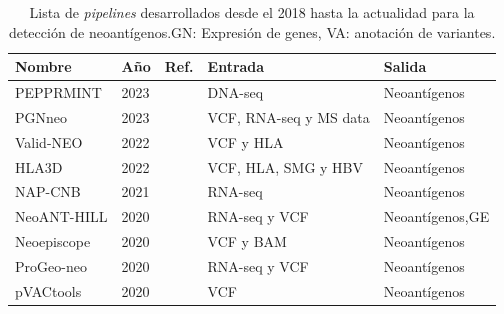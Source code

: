 \documentclass[a4paper,11pt]{article}
\begin{document}
	
\begin{table}[h]
	\caption{Lista de \textit{pipelines} desarrollados desde el 2018 hasta la actualidad para la detección de neoantígenos.GN: Expresión de genes, VA: anotación de variantes.}
	\label{tab:review_pipelines}
 \centering
	\setlength{\tabcolsep}{0.5em} %
	{\renewcommand{\arraystretch}{1.5}%
    {\footnotesize
    \begin{tabular}{lllp{4.5cm}p{2.7cm}}
	\textbf{Nombre} & \textbf{Año}  & \textbf{Ref.}                                 & \textbf{Entrada}                                         & \textbf{Salida}                                     \\ \hline
	
	PEPPRMINT         & 2023 &\cite{zhou2023prioritizing}         & DNA-seq                                                  & Neoantígenos                                        \\

	PGNneo & 2023	& \cite{tan2023pgnneo}	& VCF, RNA-seq y MS data	& Neoantígenos \\
	
	Valid-NEO       & 2022 &\cite{terai2022valid}             & VCF y HLA          & Neoantígenos  \\
	
	HLA3D & 2022	& \cite{li2022hla3d}	& VCF, HLA, SMG y HBV	& Neoantígenos \\
	
	
	
	NAP-CNB         & 2021 &\cite{wert2021predicting}         & RNA-seq                                                  & Neoantígenos                                       \\
	
	NeoANT-HILL     & 2020 &\cite{coelho2020neoant}           & RNA-seq y VCF                        & Neoantígenos,GE  \\
	
	Neoepiscope     & 2020 &\cite{wood2020neoepiscope}        & VCF y BAM                   & Neoantígenos                          \\
	
	ProGeo-neo      & 2020 &\cite{li2020progeo}               & RNA-seq y VCF                        & Neoantígenos                                       \\
	
	pVACtools       & 2020 &\cite{hundal2020pvactools}        & VCF                                         & Neoantígenos                                       \\
	

\end{tabular}}}
\end{table}
\end{document}
